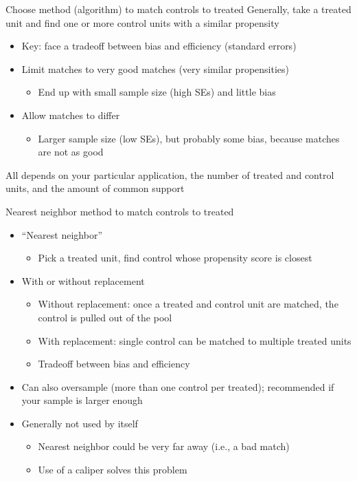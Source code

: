 \begin{frame}{Choose method (algorithm) to match controls to treated}
Generally, take a treated unit and find one or more control units with a similar propensity
\begin{itemize}
	\item Key: face a tradeoff between bias and efficiency (standard errors)
	\item Limit matches to very good matches (very similar propensities)
			\begin{itemize}
				\item End up with small sample size (high SEs) and little bias
			\end{itemize}
	\item Allow matches to differ
			\begin{itemize}
				\item Larger sample size (low SEs), but probably some bias, because matches are not as good
			\end{itemize}
\end{itemize}
\vspace{3mm}

All depends on your particular application, the number of treated and control units, and the amount of common support
\end{frame}


\begin{frame}{Nearest neighbor method to match controls to treated}
\begin{itemize}
	\item ``Nearest neighbor''
	\begin{itemize}
		\item Pick a treated unit, find control whose propensity score is closest
	\end{itemize}
	\item With or without replacement
		\begin{itemize}
			\item Without replacement: once a treated and control unit are matched, the control is pulled out of the pool
			\item With replacement: single control can be matched to multiple treated units 
			\item Tradeoff between bias and efficiency
		\end{itemize}
	\item Can also oversample (more than one control per treated); recommended if your sample is larger enough
	\item Generally not used by itself
			\begin{itemize}
				\item Nearest neighbor could be very far away (i.e., a bad match)
				\item Use of a caliper solves this problem
			\end{itemize}
\end{itemize}
\end{frame}



